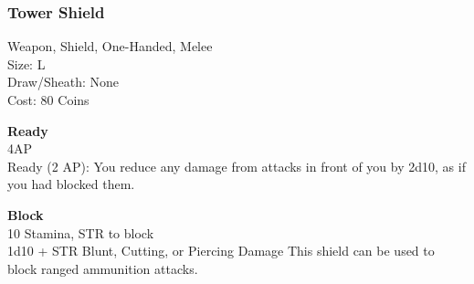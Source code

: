\subsubsection{Tower Shield}\label{weapon:towerShield}
Weapon, Shield, One-Handed, Melee\\
Size: L\\
Draw/Sheath: None\\
Cost: 80 Coins

\textbf{Ready}\\
4AP\\
Ready (2 AP): You reduce any damage from attacks in front of you by 2d10, as if you had blocked them.

\textbf{Block}\\
10 Stamina, STR to block\\
1d10 + \texttimes STR Blunt, Cutting, or Piercing Damage
This shield can be used to block ranged ammunition attacks.\\
